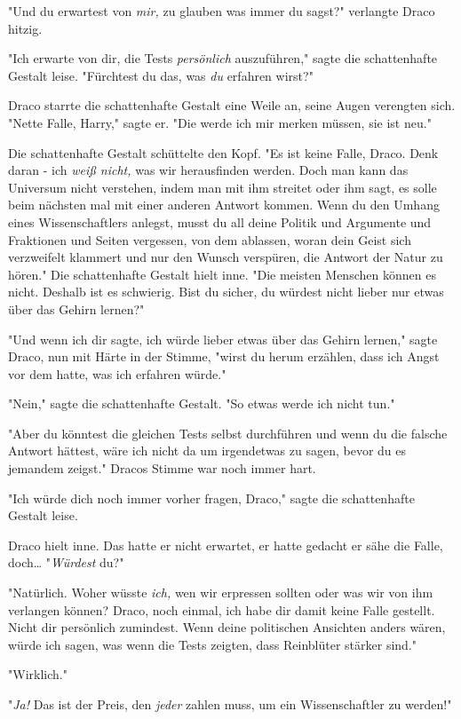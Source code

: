 {"Und du erwartest von \emph{mir,} zu glauben was immer du sagst?" verlangte Draco hitzig.

"Ich erwarte von dir, die Tests \emph{persönlich} auszuführen," sagte die schattenhafte Gestalt leise. "Fürchtest du das, was \emph{du} erfahren wirst?"

Draco starrte die schattenhafte Gestalt eine Weile an, seine Augen verengten sich. "Nette Falle, Harry," sagte er. "Die werde ich mir merken müssen, sie ist neu."

Die schattenhafte Gestalt schüttelte den Kopf. "Es ist keine Falle, Draco. Denk daran - ich \emph{weiß nicht,} was wir herausfinden werden. Doch man kann das Universum nicht verstehen, indem man mit ihm streitet oder ihm sagt, es solle beim nächsten mal mit einer anderen Antwort kommen. Wenn du den Umhang eines Wissenschaftlers anlegst, musst du all deine Politik und Argumente und Fraktionen und Seiten vergessen, von dem ablassen, woran dein Geist sich verzweifelt klammert und nur den Wunsch verspüren, die Antwort der Natur zu hören." Die schattenhafte Gestalt hielt inne. "Die meisten Menschen können es nicht. Deshalb ist es schwierig. Bist du sicher, du würdest nicht lieber nur etwas über das Gehirn lernen?"

"Und wenn ich dir sagte, ich würde lieber etwas über das Gehirn lernen," sagte Draco, nun mit Härte in der Stimme, "wirst du herum erzählen, dass ich Angst vor dem hatte, was ich erfahren würde."

"Nein," sagte die schattenhafte Gestalt. "So etwas werde ich nicht tun."

"Aber du könntest die gleichen Tests selbst durchführen und wenn du die falsche Antwort hättest, wäre ich nicht da um irgendetwas zu sagen, bevor du es jemandem zeigst." Dracos Stimme war noch immer hart.

"Ich würde dich noch immer vorher fragen, Draco," sagte die schattenhafte Gestalt leise.

Draco hielt inne. Das hatte er nicht erwartet, er hatte gedacht er sähe die Falle, doch… "\emph{Würdest} du?"

"Natürlich. Woher wüsste \emph{ich,} wen wir erpressen sollten oder was wir von ihm verlangen können? Draco, noch einmal, ich habe dir damit keine Falle gestellt. Nicht dir persönlich zumindest. Wenn deine politischen Ansichten anders wären, würde ich sagen, was wenn die Tests zeigten, dass Reinblüter stärker sind."

"Wirklich."

"\emph{Ja!} Das ist der Preis, den \emph{jeder} zahlen muss, um ein Wissenschaftler zu werden!"

}
